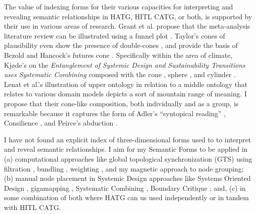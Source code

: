 The value of indexing forms for their various capacities for interpreting and revealing semantic relationships in HATG, HITL CATG, or both, is supported by their use in various areas of research. Grant et al. propose that the meta-analysis literature review can be illustrated using a funnel plot \citep[p. 94-95]{grant_typology_2009}. Taylor’s cones of plausibility even show the presence of double-cones \citep[p. 14]{taylor_creating_1990}, and provide the basis of Bezold and Hancock’s futures cone \citep[p. 73]{bezold_overview_1993}. Specifically within the area of climate, Kjøde’s on the \textit{Entanglement of Systemic Design and Sustainability Transitions uses Systematic Combining} composed with the cone \citep[p. 123]{kjode_entanglement_2024}, sphere  \citep[p. 125]{kjode_entanglement_2024}, and cylinder  \citep[p. 144]{kjode_entanglement_2024}. Lenat et al.’s illustration of upper ontology in relation to a middle ontology that relates to various domain models depicts a sort of mountain range of meaning. I propose that their cone-like composition, both individually and as a group, is remarkable because it captures the form of Adler’s “syntopical reading” \citep[p. xi]{adler_great_1952-2}, Consilience \citep{hepburn_scientific_2021,wilson_consilience_1999}, and Peirce’s abduction \citep[p. 106]{peirce_pragmatism_1960} \citep[p. 20]{sowa_challenge_2004}. 
 


I have not found an explicit index of three-dimensional forms used to to interpret and reveal semantic relationships. I aim for my Semantic Forms to be applied in (a) computational approaches like global topological synchronization (GTS) using filtration \citep[p. 1]{kovacs_iterative_2024} \citep{giusti_twos_2016}, bundling \citep[p. 1]{holten_forcedirected_2009}, weighting \citep[p. 2]{kovacs_iterative_2024}, and my magnetic approach to node grouping; (b) manual node placement in Systemic Design approaches like Systems Oriented Design \citep{sevaldson_designing_2022}, gigamapping \citep{sevaldson_giga-mapping_2011}, Systematic Combining \citep[p. 556]{dubois_systematic_2002} \citep[p. 46]{kjode_entanglement_2024}, Boundary Critique \citep{midgley_theory_1998}; and, (c) in some combination of both where HATG can us used independently or in tandem with HITL CATG.


